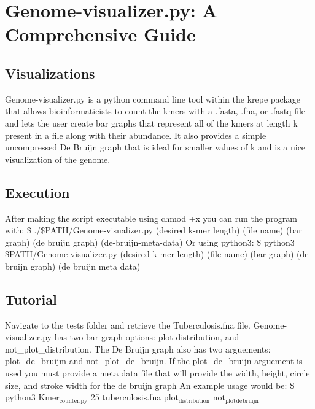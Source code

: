 \documentclass[11pt]{article}
\author{Aengus McGuinness, and Erika Pedersen}
\date{\today}
\title{}
\begin{document}
\tableofcontents

\section{Genome-visualizer.py: A Comprehensive Guide}
\label{sec:org65f9cf2}
\subsection{Visualizations}
\label{sec:orga7c17de}
Genome-visualizer.py is a python command line tool within the krepe package that
allows bioinformaticists to count the kmers with a .fasta, .fna, or .fastq
file and lets the user create bar graphs that represent all of the kmers 
at length k present in a file along with their abundance. It also provides
a simple uncompressed De Bruijn graph that is ideal for smaller values of
k and is a nice visualization of the genome.
\subsection{Execution}
\label{sec:org1dcf365}
After making the script executable using chmod +x you can run the
program with:
\$ ./\$PATH/Genome-visualizer.py (desired k-mer length) (file name) (bar graph) (de bruijn graph) (de-bruijn-meta-data)
Or using python3:
\$ python3 \$PATH/Genome-visualizer.py (desired k-mer length) (file name) (bar graph) (de bruijn graph) (de bruijn meta data)
\subsection{Tutorial}
\label{sec:org3ee5c2a}
Navigate to the tests folder and retrieve the Tuberculosis.fna file.
Genome-visualizer.py has two bar graph options: plot distribution, and
not_plot_distribution. The De Bruijn graph also has two arguements:
plot_de_bruijm and not_plot_de_bruijn. If the plot_de_bruijn arguement is used you must provide a meta data file that will provide the width, height, circle size, and stroke width for the de bruijn graph
An example usage would be:
\$ python3 Kmer\(_{\text{counter.py}}\) 25 tuberculosis.fna plot\(_{\text{distribution}}\) not\(_{\text{plot}}\)\(_{\text{de}}\)\(_{\text{bruijn}}\)
\end{document}
